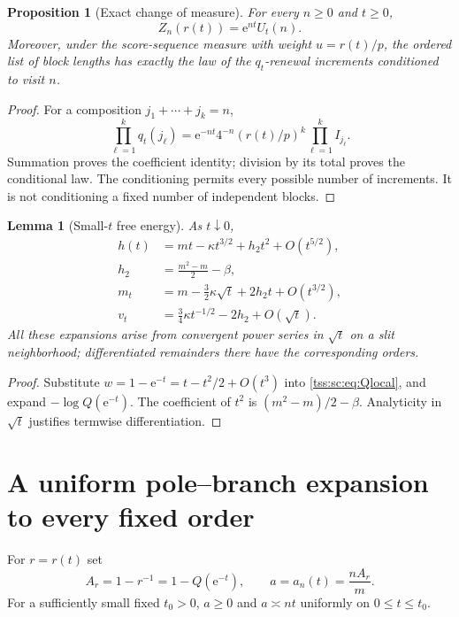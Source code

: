 \documentclass[11pt]{article}
\newtheorem{proposition}[theorem]{Proposition}
\newtheorem{lemma}[theorem]{Lemma}
\theoremstyle{remark}\newtheorem{remark}[theorem]{Remark}
\theoremstyle{definition}\newtheorem{definition}[theorem]{Definition}
\newcommand{\e}{\mathrm e}
\begin{document}
\begin{proposition}[Exact change of measure]\label{tss:sc:prop:tilt}
For every $n\geq0$ and $t\geq0$,
\begin{equation}\label{tss:sc:eq:tiltidentity}
 Z_n(r(t))=\e^{nt}U_t(n).
\end{equation}
Moreover, under the score-sequence measure with weight $u=r(t)/p$, the ordered list of block lengths has exactly the law of the $q_t$-renewal increments conditioned to visit $n$.
\end{proposition}
\begin{proof}
For a composition $j_1+\cdots+j_k=n$,
\[
 \prod_{\ell=1}^kq_t(j_\ell)
 =\e^{-nt}4^{-n}(r(t)/p)^k\prod_{\ell=1}^kI_{j_\ell}.
\]
Summation proves the coefficient identity; division by its total proves the conditional law. The conditioning permits every possible number of increments. It is not conditioning a fixed number of independent blocks.
\end{proof}

\begin{lemma}[Small-$t$ free energy]\label{tss:sc:lem:h}
As $t\downarrow0$,
\begin{align}
 h(t)&=mt-\kappa t^{3/2}+h_2t^2+O(t^{5/2}),\label{tss:sc:eq:h}\\
 h_2&=\frac{m^2-m}{2}-\beta,\nonumber\\
 m_t&=m-\tfrac32\kappa\sqrt t+2h_2t+O(t^{3/2}),\label{tss:sc:eq:mtexp}\\
 v_t&=\tfrac34\kappa t^{-1/2}-2h_2+O(\sqrt t).
 \label{tss:sc:eq:vtexp}
\end{align}
All these expansions arise from convergent power series in $\sqrt t$ on a slit neighborhood; differentiated remainders there have the corresponding orders.
\end{lemma}
\begin{proof}
Substitute $w=1-\e^{-t}=t-t^2/2+O(t^3)$ into \eqref{tss:sc:eq:Qlocal}, and expand $-\log Q(\e^{-t})$. The coefficient of $t^2$ is $(m^2-m)/2-\beta$. Analyticity in $\sqrt t$ justifies termwise differentiation.
\end{proof}

\section{A uniform pole--branch expansion to every fixed order}
\label{tss:sc:sec:uniformproof}

For $r=r(t)$ set
\begin{equation}\label{tss:sc:eq:a}
 A_r=1-r^{-1}=1-Q(\e^{-t}),\qquad
 a=a_n(t)=\frac{nA_r}{m}.
\end{equation}
For a sufficiently small fixed $t_0>0$, $a\geq0$ and $a\asymp nt$ uniformly on $0\leq t\leq t_0$.
\end{document}
